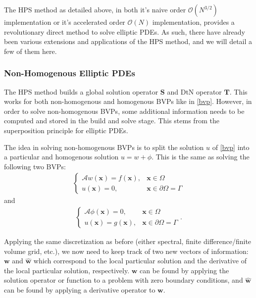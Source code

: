 The HPS method as detailed above, in both it's naive order $\mathcal{O}(N^{3/2})$ implementation or it's accelerated order $\mathcal{O}(N)$ implementation, provides a revolutionary direct method to solve elliptic PDEs. As such, there have already been various extensions and applications of the HPS method, and we will detail a few of them here.

\subsubsection{Non-Homogenous Elliptic PDEs}

The HPS method builds a global solution operator $\textbf{S}$ and DtN operator $\textbf{T}$. This works for both non-homogenous and homogenous BVPs like in \ref{bvp}. However, in order to solve non-homogenous BVPs, some additional information needs to be computed and stored in the build and solve stage. This stems from the superposition principle for elliptic PDEs.

The idea in solving non-homogenous BVPs is to split the solution $u$ of \ref{bvp} into a particular and homogenous solution $u = w + \phi$. This is the same as solving the following two BVPs:
\begin{align}
    \begin{cases}
        \mathcal{A} w(\textbf{x}) = f(\textbf{x}), &\textbf{x} \in \Omega \\
        u(\textbf{x}) = 0, &\textbf{x} \in \partial \Omega = \Gamma
    \end{cases}
\end{align}
and
\begin{align}
    \begin{cases}
        \mathcal{A} \phi(\textbf{x}) = 0, &\textbf{x} \in \Omega \\
        u(\textbf{x}) = g(\textbf{x}), &\textbf{x} \in \partial \Omega = \Gamma
    \end{cases}.
\end{align}

Applying the same discretization as before (either spectral, finite difference/finite volume grid, etc.), we now need to keep track of two new vectors of information: $\textbf{w}$ and $\hat{\textbf{w}}$ which correspond to the local particular solution and the derivative of the local particular solution, respectively. $\textbf{w}$ can be found by applying the solution operator or function to a problem with zero boundary conditions, and $\hat{\textbf{w}}$ can be found by applying a derivative operator to $\textbf{w}$.


